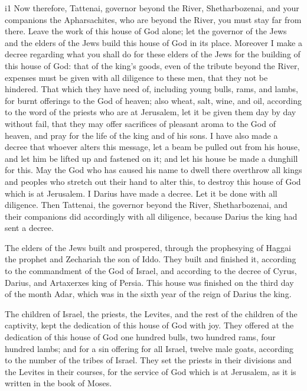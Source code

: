 i1 Now therefore, Tattenai, governor beyond the River,
Shetharbozenai, and your companions the Apharsachites, who are beyond
the River, you must stay far from there.  Leave the work of
this house of God alone; let the governor of the Jews and the elders of
the Jews build this house of God in its place.  Moreover I
make a decree regarding what you shall do for these elders of the Jews
for the building of this house of God: that of the king's goods, even of
the tribute beyond the River, expenses must be given with all diligence
to these men, that they not be hindered.  That which they
have need of, including young bulls, rams, and lambs, for burnt
offerings to the God of heaven; also wheat, salt, wine, and oil,
according to the word of the priests who are at Jerusalem, let it be
given them day by day without fail,  that they may offer
sacrifices of pleasant aroma to the God of heaven, and pray for the life
of the king and of his sons.  I have also made a decree
that whoever alters this message, let a beam be pulled out from his
house, and let him be lifted up and fastened on it; and let his house be
made a dunghill for this.  May the God who has caused his
name to dwell there overthrow all kings and peoples who stretch out
their hand to alter this, to destroy this house of God which is at
Jerusalem. I Darius have made a decree. Let it be done with all
diligence.  Then Tattenai, the governor beyond the River,
Shetharbozenai, and their companions did accordingly with all diligence,
because Darius the king had sent a decree.

 The elders of the Jews built and prospered, through the
prophesying of Haggai the prophet and Zechariah the son of Iddo. They
built and finished it, according to the commandment of the God of
Israel, and according to the decree of Cyrus, Darius, and Artaxerxes
king of Persia.  This house was finished on the third day
of the month Adar, which was in the sixth year of the reign of Darius
the king.

 The children of Israel, the priests, the Levites, and the
rest of the children of the captivity, kept the dedication of this house
of God with joy.  They offered at the dedication of this
house of God one hundred bulls, two hundred rams, four hundred lambs;
and for a sin offering for all Israel, twelve male goats, according to
the number of the tribes of Israel.  They set the priests
in their divisions and the Levites in their courses, for the service of
God which is at Jerusalem, as it is written in the book of Moses.

